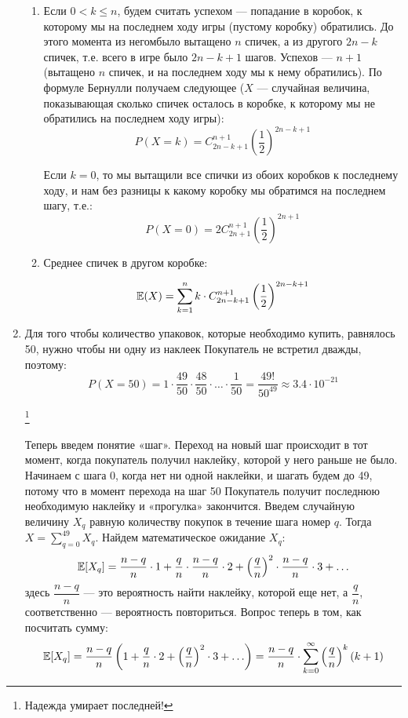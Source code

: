 \documentclass[12pt, a4paper]{article}\usepackage[]{graphicx}\usepackage[]{color}
\begin{document}
\begin{enumerate}
\begin{enumerate}
\item Если $0<k \leqslant n$, будем считать успехом — попадание в коробок, к которому мы на последнем ходу игры (пустому коробку) обратились. До этого момента из негомбыло вытащено $n$ спичек, а из другого $2n-k$ спичек, т.е. всего в игре было $2n - k + 1$ шагов. Успехов — $n + 1$ (вытащено $n$ спичек, и на последнем ходу мы к нему обратились). По формуле Бернулли получаем следующее ($X$ — случайная величина, показывающая сколько спичек осталось в коробке, к которому мы не обратились на последнем ходу игры):
\[P(X = k) = C^{n+1}_{2n-k+1} \left(\dfrac{1}{2} \right)^{2n-k+1}\]

Если $k = 0$, то мы вытащили все спички из обоих коробков к последнему ходу, и нам без разницы к какому коробку мы обратимся на последнем шагу, т.е.:
\[P(X = 0) =2 C^{n+1}_{2n+1} \left(\dfrac{1}{2} \right)^{2n+1}\]

\item Среднее спичек в другом коробке:

\[\mathbb{E}(X) = \sum \limits_{k=1}^{n} k \cdot C^{n+1}_{2n-k+1} \left(\dfrac{1}{2} \right)^{2n-k+1}\]


\end{enumerate}


\item
Для того чтобы количество упаковок, которые необходимо купить, равнялось 50, нужно чтобы ни одну из наклеек Покупатель не встретил дважды, поэтому:
\[
P(X=50) = 1\cdot\frac{49}{50}\cdot\frac{48}{50}\cdot\dots\cdot\frac{1}{50} = \frac{49!}{50^{49}} \approx 3.4\cdot
10^{-21}\] \vspace{-1cm}

\hspace{10.5cm}\footnote[2]{Надежда умирает последней!}

Теперь введем понятие «шаг». Переход на новый шаг происходит в тот момент, когда покупатель получил наклейку, которой у него раньше не было. Начинаем с шага 0, когда нет ни одной наклейки, и шагать будем до 49, потому что в момент перехода на шаг 50 Покупатель получит последнюю необходимую наклейку и «прогулка» закончится. Введем случайную величину $X_q$ равную количеству покупок в течение шага номер $q$. Тогда $X = \sum \limits_{q=0}^{49}X_q$.  Найдем математическое ожидание $X_q$:
\[
\mathbb{E}[X_q] = \frac{n-q}{n}\cdot 1 + \frac{q}{n}\cdot\frac{n-q}{n}\cdot 2 + \left(\frac{q}{n}\right)^2\cdot\frac{n-q}{n}\cdot 3 + \ldots
\]
здесь $\dfrac{n-q}{n}$ —  это вероятность найти наклейку, которой еще нет, а $\dfrac{q}{n}$, соответственно — вероятность повториться. Вопрос теперь в том, как посчитать сумму:
\[
\mathbb{E}[X_q] = \frac{n-q}{n}\left( 1 + \frac{q}{n}\cdot 2 + \left(\frac{q}{n}\right)^2 \cdot 3 + \ldots\right) = \frac{n-q}{n}\cdot\sum\limits_{k=0}^{\infty}\left(\frac{q}{n}\right)^k(k+1)
\]


\end{enumerate}
\end{document}
